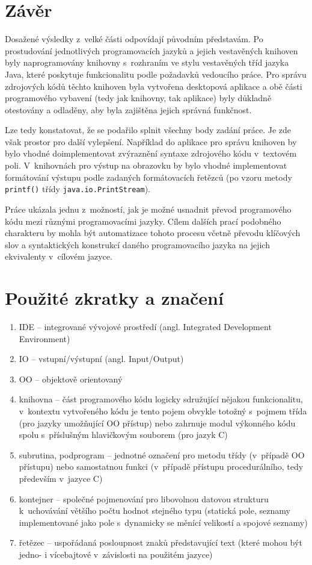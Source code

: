 \documentclass[czech,BP]{thesiskiv}
\begin{document}
\chapter{Závěr}
Dosažené výsledky z~velké části odpovídají původním představám. Po prostudování jednotlivých programovacích jazyků a jejich vestavěných knihoven byly naprogramovány knihovny s~rozhraním ve stylu vestavěných tříd jazyka Java, které poskytuje funkcionalitu podle požadavků vedoucího práce. Pro správu zdrojových kódů těchto knihoven byla vytvořena desktopová aplikace a obě části programového vybavení (tedy jak knihovny, tak aplikace) byly důkladně otestovány a odladěny, aby byla zajištěna jejich správná funkčnost.\par
Lze tedy konstatovat, že se podařilo splnit všechny body zadání práce. Je zde však prostor pro další vylepšení. Například do aplikace pro správu knihoven by bylo vhodné doimplementovat zvýraznění syntaxe zdrojového kódu v~textovém poli. V~knihovnách pro výstup na obrazovku by bylo vhodné implementovat formátování výstupu podle zadaných formátovacích řetězců (po vzoru metody \texttt{printf()} třídy \texttt{java.io.PrintStream}).\par
Práce ukázala jednu z~možností, jak je možné usnadnit převod programového kódu mezi různými programovacími jazyky. Cílem dalších prací podobného charakteru by mohla být automatizace tohoto procesu včetně převodu klíčových slov a syntaktických konstrukcí daného programovacího jazyka na jejich ekvivalenty v~cílovém jazyce.

% 
%

{\raggedright\small

}

\chapter*{Použité zkratky a značení}
\begin{enumerate}
\item{IDE -- integrované vývojové prostředí (angl. Integrated Development Environment)}
\item{IO -- vstupní/výstupní (angl. Input/Output)}
\item{OO -- objektově orientovaný}
\item{knihovna -- část programového kódu logicky sdružující nějakou funkcionalitu, v~kontextu vytvořeného kódu je tento pojem obvykle totožný s~pojmem třída (pro jazyky umožňující OO přístup) nebo zahrnuje modul výkonného kódu spolu s~příslušným hlavičkovým souborem (pro jazyk C)}
\item{subrutina, podprogram -- jednotné označení pro metodu třídy (v~případě OO přístupu) nebo samostatnou funkci (v~případě přístupu procedurálního, tedy především v~jazyce C)}
\item{kontejner -- společné pojmenování pro libovolnou datovou strukturu k~uchovávání většího počtu hodnot stejného typu (statická pole, seznamy implementované jako pole s~dynamicky se měnící velikostí a spojové seznamy)}
\item{řetězec -- uspořádaná posloupnost znaků představující text (které mohou být jedno- i vícebajtové v~závislosti na použitém jazyce)}
\end{enumerate}
\end{document}
